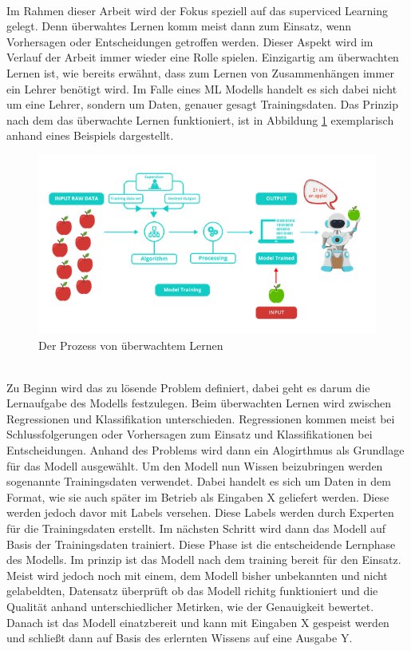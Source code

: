 \begin{onehalfspace}
        \\
        Im Rahmen dieser Arbeit wird der Fokus speziell auf das superviced Learning gelegt. Denn überwahtes Lernen komm meist dann zum Einsatz, wenn Vorhersagen oder Entscheidungen getroffen werden. Dieser Aspekt wird im Verlauf der Arbeit immer wieder eine Rolle spielen. Einzigartig am überwachten Lernen ist, wie bereits erwähnt, dass zum Lernen von Zusammenhängen immer ein \glqq{}Lehrer\grqq{} benötigt wird. Im Falle eines \ac{ML} Modells handelt es sich dabei nicht um eine Lehrer, sondern um Daten, genauer gesagt Trainingsdaten.
        Das Prinzip nach dem das überwachte Lernen funktioniert, ist in Abbildung \ref*{fig:learningProcess} exemplarisch anhand eines Beispiels dargestellt.
        \begin{figure}[h]
            \centering
            \includegraphics[width = 14cm]{Bilder/superviced_learning.png}
            \caption{Der Prozess von überwachtem Lernen \cite{Kharwal2020}}
            \label{fig:learningProcess}
        \end{figure}
        \\
        Zu Beginn wird das zu lösende Problem definiert, dabei geht es darum die Lernaufgabe des Modells festzulegen. Beim überwachten Lernen wird zwischen Regressionen und Klassifikation unterschieden. Regressionen kommen meist bei Schlussfolgerungen oder Vorhersagen zum Einsatz und Klassifikationen bei Entscheidungen. 
        Anhand des Problems wird dann ein Alogirthmus als Grundlage für das Modell ausgewählt. Um den Modell nun Wissen beizubringen werden sogenannte Trainingsdaten verwendet. Dabei handelt es sich um Daten in dem Format, wie sie auch später im Betrieb als Eingaben X geliefert werden. Diese werden jedoch davor mit Labels versehen. Diese Labels werden durch Experten für die Trainingsdaten erstellt. Im nächsten Schritt wird dann das Modell auf Basis der Trainingsdaten trainiert. Diese Phase ist die entscheidende Lernphase des Modells. Im prinzip ist das Modell nach dem training bereit für den Einsatz. Meist wird jedoch noch mit einem, dem Modell bisher unbekannten und nicht gelabeldten, Datensatz überprüft ob das Modell richitg funktioniert und die Qualität anhand unterschiedlicher Metirken, wie der Genauigkeit bewertet. Danach ist das Modell einatzbereit und kann mit Eingaben X gespeist werden und schließt dann auf Basis des erlernten Wissens auf eine Ausgabe Y.\cite{Horn2022}\cite{Döbel2018}

\end{onehalfspace}
